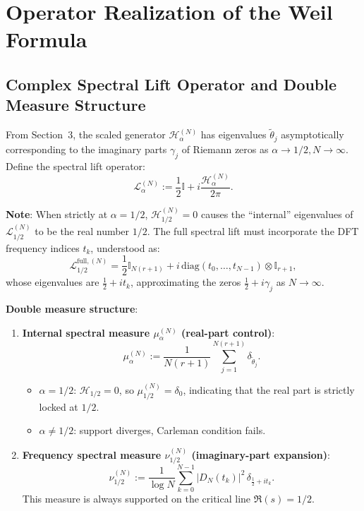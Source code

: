 \documentclass[12pt,a4paper]{amsart}
\theoremstyle{plain}
\theoremstyle{definition}
\theoremstyle{remark}
\begin{document}
\section{Operator Realization of the Weil Formula}

\subsection{Complex Spectral Lift Operator and Double Measure Structure}

From Section~3, the scaled generator $\mathcal{H}_\alpha^{(N)}$ has eigenvalues $\tilde{\theta}_j$ asymptotically corresponding to the imaginary parts $\gamma_j$ of Riemann zeros as $\alpha\to1/2,N\to\infty$. Define the spectral lift operator:
\[
\mathcal{L}_\alpha^{(N)} := \frac{1}{2}\mathbb{I} + i\frac{\mathcal{H}_\alpha^{(N)}}{2\pi}.
\]

\textbf{Note}: When strictly at $\alpha=1/2$, $\mathcal{H}_{1/2}^{(N)}=0$ causes the ``internal'' eigenvalues of $\mathcal{L}_{1/2}^{(N)}$ to be the real number $1/2$. The full spectral lift must incorporate the DFT frequency indices $t_k$, understood as:
\[
\mathcal{L}_{1/2}^{\mathrm{full},(N)} = \frac{1}{2}\mathbb{I}_{N(r+1)} + i\, \mathrm{diag}(t_0,\dots,t_{N-1}) \otimes \mathbb{I}_{r+1},
\]
whose eigenvalues are $\frac{1}{2} + i t_k$, approximating the zeros $\frac{1}{2}+i\gamma_j$ as $N\to\infty$.

\textbf{Double measure structure}:

\begin{enumerate}
\item \textbf{Internal spectral measure $\mu_\alpha^{(N)}$ (real-part control)}:
\[
\mu_\alpha^{(N)} := \frac{1}{N(r+1)}\sum_{j=1}^{N(r+1)} \delta_{\tilde{\theta}_j}.
\]
\begin{itemize}
\item $\alpha=1/2$: $\mathcal{H}_{1/2}=0$, so $\mu_{1/2}^{(N)} = \delta_0$, indicating that the real part is strictly locked at $1/2$.
\item $\alpha\neq 1/2$: support diverges, Carleman condition fails.
\end{itemize}

\item \textbf{Frequency spectral measure $\nu_{1/2}^{(N)}$ (imaginary-part expansion)}:
\[
\nu_{1/2}^{(N)} := \frac{1}{\log N} \sum_{k=0}^{N-1} |D_N(t_k)|^2 \,\delta_{\frac{1}{2} + i t_k}.
\]
This measure is always supported on the critical line $\Re(s)=1/2$.
\end{enumerate}
\end{document}
